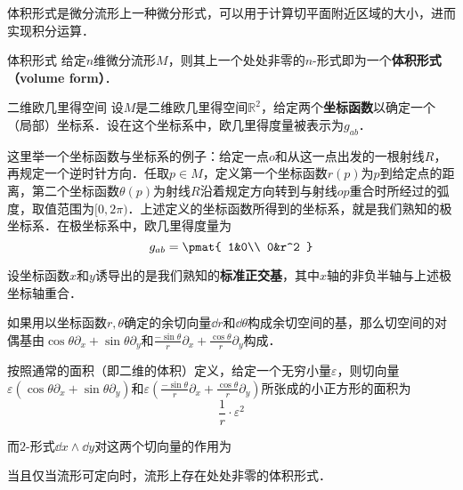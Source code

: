 



体积形式是微分流形上一种微分形式，可以用于计算切平面附近区域的大小，进而实现积分运算．

\begin{definition}{体积形式}
给定$n$维微分流形$M$，则其上一个处处非零的$n$-形式即为一个\textbf{体积形式（volume form）}．
\end{definition}

\begin{example}{二维欧几里得空间}
设$M$是二维欧几里得空间$\mathbb{R}^2$，给定两个\textbf{坐标函数}以确定一个（局部）坐标系．设在这个坐标系中，欧几里得度量被表示为$g_{ab}$．

这里举一个坐标函数与坐标系的例子：给定一点$o$和从这一点出发的一根射线$R$，再规定一个逆时针方向．任取$p\in M$，定义第一个坐标函数$r(p)$为$p$到给定点的距离，第二个坐标函数$\theta(p)$为射线$R$沿着规定方向转到与射线$op$重合时所经过的弧度，取值范围为$[0, 2\pi)$．上述定义的坐标函数所得到的坐标系，就是我们熟知的极坐标系．在极坐标系中，欧几里得度量为
\begin{equation}
g_{ab}=\pmat{
    1&0\\
    0&r^2
}
\end{equation}

设坐标函数$x$和$y$诱导出的是我们熟知的\textbf{标准正交基}，其中$x$轴的非负半轴与上述极坐标轴重合．

如果用以坐标函数$r, \theta$确定的余切向量$\dd r$和$\dd \theta$构成余切空间的基，那么切空间的对偶基由$\cos\theta\partial_x+\sin\theta\partial_y$和$\frac{-\sin\theta}{r}\partial_x+\frac{\cos\theta}{r}\partial_y$构成．

按照通常的面积（即二维的体积）定义，给定一个无穷小量$\varepsilon$，则切向量$\varepsilon(\cos\theta\partial_x+\sin\theta\partial_y)$和$\varepsilon(\frac{-\sin\theta}{r}\partial_x+\frac{\cos\theta}{r}\partial_y)$所张成的小正方形的面积为
\begin{equation}
\frac{1}{r}\cdot \varepsilon^2
\end{equation}

而$2$-形式$\dd x\wedge\dd y$对这两个切向量的作用为


\end{example}






\begin{theorem}{}
当且仅当流形可定向时，流形上存在处处非零的体积形式．
\end{theorem}






















